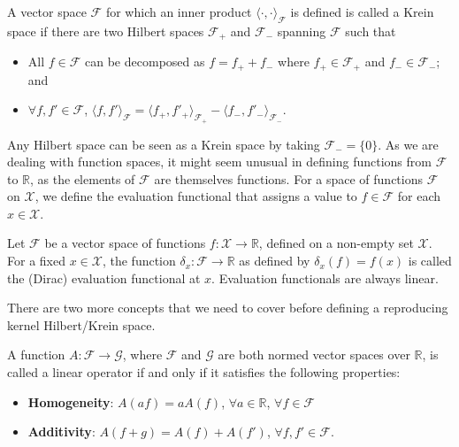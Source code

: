 \begin{definition}\label{def:krein}
	A vector space $\mathcal F$ for which an inner product $\langle\cdot,\cdot\rangle_{\mathcal F}$ is defined is called a Krein space if there are two Hilbert spaces $\mathcal{F}_+$ and $\mathcal{F}_-$ spanning $\mathcal F$ such that
	\begin{itemize}
		\item All $f \in \mathcal F$ can be decomposed as $f = f_+ + f_-$ where $f_+ \in \mathcal{F}_+$ and $f_- \in \mathcal{F}_-$; and
		\item $\forall f, f' \in \mathcal F$, $\langle f, f' \rangle_{\mathcal F} = \langle f_+, f'_+ \rangle_{\mathcal{F_+}} - \langle f_-, f'_- \rangle_{\mathcal{F_-}}$.
	\end{itemize}
\end{definition}

Any Hilbert space can be seen as a Krein space by taking $\mathcal{F_-} = \{0\}$.
As we are dealing with function spaces, it might seem unusual in defining functions from $\mathcal F$ to $\mathbb R$, as the elements of $\mathcal F$ are themselves functions. For a space of functions $\mathcal F$ on $\mathcal X$, we define the evaluation functional that assigns a value to $f \in \mathcal F$ for each $x \in \mathcal X$.

\begin{definition}
	Let $\mathcal F$ be a vector space of functions $f:\mathcal X \rightarrow \mathbb R$, defined on a non-empty set $\mathcal X$. For a fixed $x \in \mathcal X$, the function $\delta_x:\mathcal F \rightarrow \mathbb R$ as defined by $\delta_x(f) = f(x)$ is called the (Dirac) evaluation functional at $x$. Evaluation functionals are always linear.
\end{definition}

There are two more concepts that we need to cover before defining a reproducing kernel Hilbert/Krein space.

\begin{definition}
	A function $A:\mathcal F \rightarrow \mathcal G$, where $\mathcal F$ and $\mathcal G$ are both normed vector spaces over $\mathbb R$, is called a linear operator if and only if it satisfies the following properties:
	\begin{itemize}
		\item \textbf{Homogeneity}: $A(af) = a A(f)$, $\forall a \in \mathbb R$, $\forall f \in \mathcal F$
		\item \textbf{Additivity}: $A(f+g) = A(f) + A(f')$, $\forall f,f' \in \mathcal F$.
	\end{itemize}	
\end{definition}

